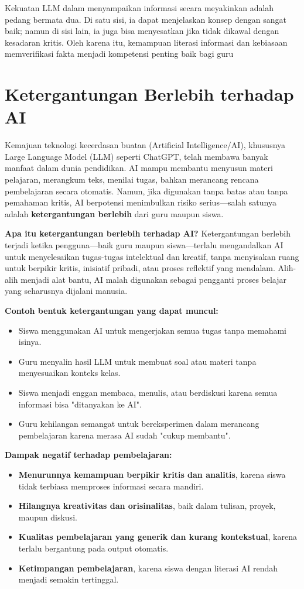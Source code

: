Kekuatan LLM dalam menyampaikan informasi secara meyakinkan adalah pedang bermata dua. Di satu sisi, ia dapat menjelaskan konsep dengan sangat baik; namun di sisi lain, ia juga bisa menyesatkan jika tidak dikawal dengan kesadaran kritis. Oleh karena itu, kemampuan literasi informasi dan kebiasaan memverifikasi fakta menjadi kompetensi penting baik bagi guru

\section{Ketergantungan Berlebih terhadap AI}

Kemajuan teknologi kecerdasan buatan (Artificial Intelligence/AI), khususnya Large Language Model (LLM) seperti ChatGPT, telah membawa banyak manfaat dalam dunia pendidikan. AI mampu membantu menyusun materi pelajaran, merangkum teks, menilai tugas, bahkan merancang rencana pembelajaran secara otomatis. Namun, jika digunakan tanpa batas atau tanpa pemahaman kritis, AI berpotensi menimbulkan risiko serius—salah satunya adalah \textbf{ketergantungan berlebih} dari guru maupun siswa.

\textbf{Apa itu ketergantungan berlebih terhadap AI?}  
Ketergantungan berlebih terjadi ketika pengguna—baik guru maupun siswa—terlalu mengandalkan AI untuk menyelesaikan tugas-tugas intelektual dan kreatif, tanpa menyisakan ruang untuk berpikir kritis, inisiatif pribadi, atau proses reflektif yang mendalam. Alih-alih menjadi alat bantu, AI malah digunakan sebagai pengganti proses belajar yang seharusnya dijalani manusia.

\textbf{Contoh bentuk ketergantungan yang dapat muncul:}
\begin{itemize}
	\item Siswa menggunakan AI untuk mengerjakan semua tugas tanpa memahami isinya.
	\item Guru menyalin hasil LLM untuk membuat soal atau materi tanpa menyesuaikan konteks kelas.
	\item Siswa menjadi enggan membaca, menulis, atau berdiskusi karena semua informasi bisa "ditanyakan ke AI".
	\item Guru kehilangan semangat untuk bereksperimen dalam merancang pembelajaran karena merasa AI sudah "cukup membantu".
\end{itemize}

\textbf{Dampak negatif terhadap pembelajaran:}
\begin{itemize}
	\item \textbf{Menurunnya kemampuan berpikir kritis dan analitis}, karena siswa tidak terbiasa memproses informasi secara mandiri.
	\item \textbf{Hilangnya kreativitas dan orisinalitas}, baik dalam tulisan, proyek, maupun diskusi.
	\item \textbf{Kualitas pembelajaran yang generik dan kurang kontekstual}, karena terlalu bergantung pada output otomatis.
	\item \textbf{Ketimpangan pembelajaran}, karena siswa dengan literasi AI rendah menjadi semakin tertinggal.
\end{itemize}


